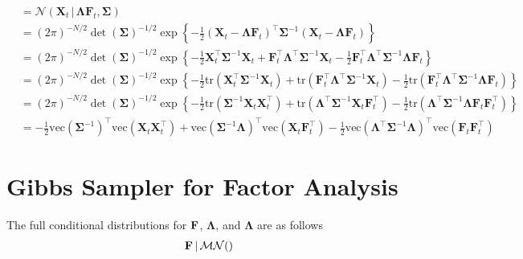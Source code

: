\begin{align*}
	&= \mathcal{N} \left( {\bm X}_t \, \vert \, {\bm \Lambda} {\bm F}_t, {\bm \Sigma} \right) \\
	&= \left( 2 \pi \right)^{-N/2} \det \left( {\bm \Sigma} \right)^{-1/2} \exp \left\{ -\frac12 \left( {\bm X}_t - {\bm \Lambda} {\bm F}_t \right)^{\top} {\bm \Sigma}^{-1} \left( {\bm X}_t - {\bm \Lambda} {\bm F}_t \right) \right\} \\
	&= \left( 2 \pi \right)^{-N/2} \det \left( {\bm \Sigma} \right)^{-1/2} \exp \left\{ -\frac12 {\bm X}_t^{\top} {\bm \Sigma}^{-1} {\bm X}_t + {\bm F}_t^{\top} {\bm \Lambda}^{\top} {\bm \Sigma}^{-1} {\bm X}_t - \frac12 {\bm F}_t^{\top} {\bm \Lambda}^{\top} {\bm \Sigma}^{-1} {\bm \Lambda} {\bm F}_t \right\} \\
	&= \left( 2 \pi \right)^{-N/2} \det \left( {\bm \Sigma} \right)^{-1/2} \exp \left\{ -\frac12 \text{tr} \left( {\bm X}_t^{\top} {\bm \Sigma}^{-1} {\bm X}_t \right) + \text{tr} \left( {\bm F}_t^{\top} {\bm \Lambda}^{\top} {\bm \Sigma}^{-1} {\bm X}_t \right) - \frac12 \text{tr} \left( {\bm F}_t^{\top} {\bm \Lambda}^{\top} {\bm \Sigma}^{-1} {\bm \Lambda} {\bm F}_t \right) \right\} \\
	&= \left( 2 \pi \right)^{-N/2} \det \left( {\bm \Sigma} \right)^{-1/2} \exp \left\{ -\frac12 \text{tr} \left( {\bm \Sigma}^{-1} {\bm X}_t {\bm X}_t^{\top} \right) + \text{tr} \left( {\bm \Lambda}^{\top} {\bm \Sigma}^{-1} {\bm X}_t {\bm F}_t^{\top} \right) - \frac12 \text{tr} \left( {\bm \Lambda}^{\top} {\bm \Sigma}^{-1} {\bm \Lambda} {\bm F}_t {\bm F}_t^{\top} \right) \right\} \\
	&= -\frac12 \text{vec} \left( {\bm \Sigma}^{-1} \right)^{\top} \text{vec} \left( {\bm X}_t {\bm X}_t^{\top} \right) + \text{vec} \left( {\bm \Sigma}^{-1} {\bm \Lambda} \right)^{\top} \text{vec} \left( {\bm X}_t {\bm F}_t^{\top} \right) - \frac12 \text{vec} \left( {\bm \Lambda}^{\top} {\bm \Sigma}^{-1} {\bm \Lambda} \right)^{\top} \text{vec} \left( {\bm F}_t {\bm F}_t^{\top} \right)
\end{align*}

\section{Gibbs Sampler for Factor Analysis}
The full conditional distributions for ${\bf F}$, ${\bm \Lambda}$, and ${\bm \Lambda}$ are as follows
\begin{align}
	{\bf F} \, \vert \, \mathcal{MN} \mleft( \mright)
\end{align}






